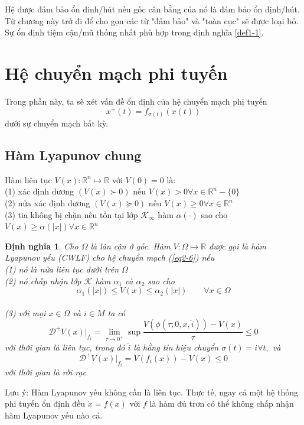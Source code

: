 \documentclass[14pt,a4paper,oneside]{report}		%
\newtheorem{define}[theorem]{Định nghĩa}
\begin{document}
Hệ được đảm bảo ổn đinh/hút nếu gốc cân bằng của nó là đảm bảo ổn định/hút. Từ chương này trở đi để cho gọn các từ "đảm bảo" và "toàn cục" sẽ được loại bỏ. Sự ổn định tiệm cận/mũ thống nhất phù hợp trong định nghĩa \ref{def1-1}.

\section{Hệ chuyển mạch phi tuyến}
Trong phần này, ta sẽ xét vấn đề ổn định của hệ chuyển mạch phị tuyến
\begin{equation} \label{eq2-6}
x^+(t)=f_{\sigma (t)}(x(t))
\end{equation}
dưới sự chuyển mạch bất kỳ.
\subsection{Hàm Lyapunov chung}
Hàm liên tục $V(x): \mathbb{R}^n\mapsto \mathbb{R}$ với $V(0)=0$ là:\\
(1) xác định dương $(V(x)\succ 0)$ nếu $V(x)>0\forall x\in\mathbb{R}^n-\{0\}$ \\
(2) nửa xác định dương $(V(x)\succeq 0)$ nếu $V(x)\geq 0\forall x\in\mathbb{R}^n$ \\
(3) tia không bị chặn nếu tồn tại lớp $\mathcal{K}_\infty$ hàm $\alpha (\cdot)$ sao cho $V(x)\geq \alpha(|x|)\forall x\in\mathbb{R}^n$ \\

\begin{define} \label{def2-2}
Cho $\Omega$ là lân cận ở gốc. Hàm $V:\Omega \mapsto\mathbb{R}$ được gọi là hàm Lyapunov yếu (CWLF) cho hệ chuyển mạch (\ref{eq2-6}) nếu \\
(1) nó là nửa liên tục dưới trên $\Omega$\\
(2) nó chấp nhận lớp $\mathcal{K}$ hàm $\alpha_1$ và $\alpha_2$ sao cho
$$\alpha_1(|x|)\leq V(x)\leq \alpha_2(|x|)\qquad \forall x\in\Omega$$\\
(3) với mọi $x\in\Omega$ và $i\in M$ ta có
$$\mathcal{D}^+V(x)|_{f_i} = \lim_{\tau \rightarrow 0^+}\sup\frac{V(\phi(\tau;0,x,\widehat{i}))-V(x)}{\tau}\leq 0$$
với thời gian là liên tục, trong đó $\widehat{i}$ là hằng tín hiệu chuyển $\sigma(t)=i \forall t,$ và
$$\mathcal{D}^+V(x)|_{f_i}=V(f_i(x))-V(x)\leq 0$$
với thời gian là rời rạc
\end{define}

Lưu ý: Hàm Lyapunov yếu không cần là liên tục. Thực tế, ngay cả một hệ thống phi tuyến ổn định đều $\dot{x}=f(x)$ với $f$ là hàm đủ trơn có thể không chấp nhận hàm Lyapunov yếu nào cả.
\end{document}

